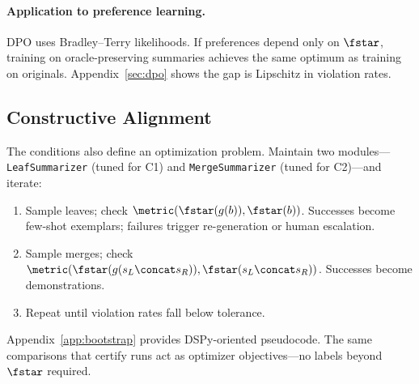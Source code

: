 \paragraph{Application to preference learning.}
DPO \citep{RafailovEtAl2023DPO} uses Bradley--Terry likelihoods. If preferences depend only on $\fstar$, training on oracle-preserving summaries achieves the same optimum as training on originals. Appendix~\ref{sec:dpo} shows the gap is Lipschitz in violation rates.

\subsection{Constructive Alignment}\label{sec:bootstrap-main}

The conditions also define an optimization problem. Maintain two modules---\texttt{LeafSummarizer} (tuned for C1) and \texttt{MergeSummarizer} (tuned for C2)---and iterate:
\begin{enumerate}[label=\roman*.]
    \item Sample leaves; check $\metric(\fstar(g(b)), \fstar(b))$. Successes become few-shot exemplars; failures trigger re-generation or human escalation.
    \item Sample merges; check $\metric(\fstar(g(s_L \concat s_R)), \fstar(s_L \concat s_R))$. Successes become demonstrations.
    \item Repeat until violation rates fall below tolerance.
\end{enumerate}
Appendix~\ref{app:bootstrap} provides DSPy-oriented pseudocode. The same comparisons that certify runs act as optimizer objectives---no labels beyond $\fstar$ required.
